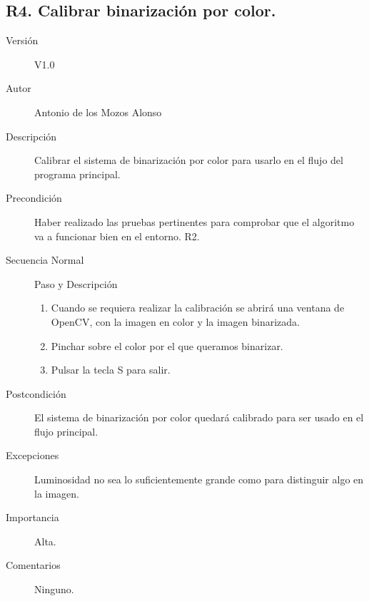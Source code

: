 \subsection{R4. Calibrar binarización por color.}
\begin{description}
	\item [Versión] V1.0
	\item [Autor] Antonio de los Mozos Alonso
	\item [Descripción] Calibrar el sistema de binarización por color para usarlo en el flujo del programa principal.
	\item [Precondición] Haber realizado las pruebas pertinentes para comprobar que el algoritmo va a funcionar bien en el entorno. R2.
	\item [Secuencia Normal] Paso y Descripción
		\begin{enumerate}
			\item Cuando se requiera realizar la calibración se abrirá una ventana de OpenCV, con la imagen en color y la imagen binarizada.
			
			\item Pinchar sobre el color por el que queramos binarizar.
			
			\item Pulsar la tecla S para salir.
		\end{enumerate}
	\item [Postcondición] El sistema de binarización por color quedará calibrado para ser usado en el flujo principal.
	\item [Excepciones] Luminosidad no sea lo suficientemente grande como para distinguir algo en la imagen.
	\item [Importancia] Alta.
	\item [Comentarios] Ninguno.
\end{description}

